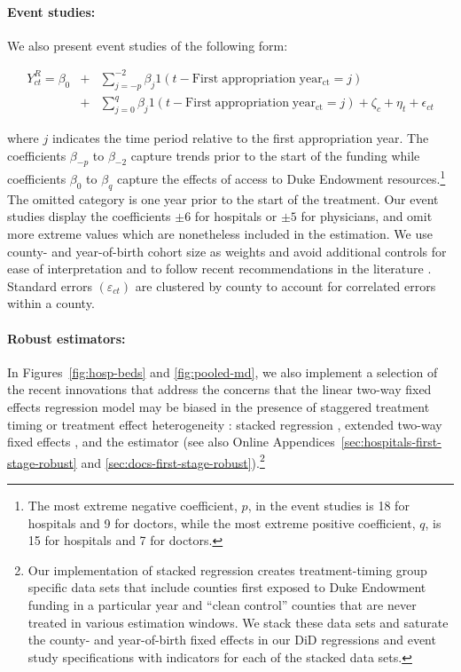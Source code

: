 \documentclass[12pt]{article}
\begin{document}
\noindent \paragraph{Event studies:} We also present event studies of the following form:
\vspace{-.25cm}
\begin{footnotesize}
\begin{singlespace}
\begin{eqnarray}
    Y^{R}_{ct} = \beta_0
        &+& \sum_{j=-p}^{-2}\beta_j 1(t - \mathrm{First \; appropriation \; year_{ct}} = j) \nonumber \\
        &+& \sum_{j=0}^{q}\beta_j 1(t - \mathrm{First \; appropriation \; year_{ct}} = j) + \zeta_c + \eta_t + \epsilon_{ct} \label{eq:event-study-first-stage}
\end{eqnarray}
\end{singlespace}
\end{footnotesize}
\noindent where $j$ indicates the time period relative to the first appropriation year.
The coefficients $\beta_{-p}$ to $\beta_{-2}$ capture trends prior to the start of the funding while coefficients $\beta_{0}$ to $\beta_{q}$ capture the effects of access to Duke Endowment resources.\footnote{The most extreme negative coefficient, $p$, in the event studies is 18 for hospitals and 9 for doctors, while the most extreme positive coefficient, $q$, is 15 for hospitals and 7 for doctors.} 
The omitted category is one year prior to the start of the treatment. 
Our event studies display the coefficients $\pm 6$ for hospitals or $\pm 5$ for physicians, and omit more extreme values which are nonetheless included in the estimation. 
We use county- and year-of-birth cohort size as weights and avoid additional controls for ease of interpretation and to follow recent recommendations in the literature .
Standard errors $(\varepsilon_{ct})$ are clustered by county to account for correlated errors within a county.

\noindent \paragraph{Robust estimators:} In Figures~\ref{fig:hosp-beds} and \ref{fig:pooled-md}, we also implement a selection of the recent innovations that address the concerns that the linear two-way fixed effects regression model may be biased in the presence of staggered treatment timing or treatment effect heterogeneity : stacked regression , extended two-way fixed effects , and the  estimator (see also Online Appendices~\ref{sec:hospitals-first-stage-robust} and \ref{sec:docs-first-stage-robust}).\footnote{
Our implementation of stacked regression creates treatment-timing group specific data sets that include counties first exposed to Duke Endowment funding in a particular year and ``clean control'' counties that are never treated in various estimation windows.
We stack these data sets and saturate the county- and year-of-birth fixed effects in our DiD regressions and event study specifications with indicators for each of the stacked data sets.}
\end{document}
